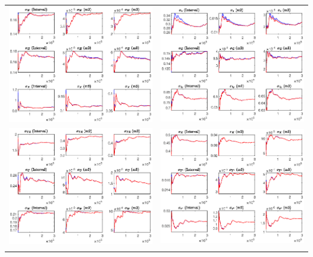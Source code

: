 \documentclass[a4paper,11pt]{article}
\numberwithin{equation}{section}
\begin{document}
\begin{minipage}{\linewidth}
{\begin{tabular}{p{9cm} p{9cm}}
			\includegraphics[width=9cm, trim =0 0 0.97cm 0]{SAFiscal_udiag3.eps} & \includegraphics[width=9cm, trim =0.97cm 0 0 0]{SAFiscal_udiag4.eps}\\
			\includegraphics[width=9cm, trim =0 0 0.97cm 0]{SAFiscal_udiag5.eps} & \includegraphics[width=9cm, trim =0.97cm 0 0 0]{SAFiscal_udiag6.eps}\\
			\label{fig_conv_plot}
		\end{tabular}
	}
\end{minipage}
\end{document}

